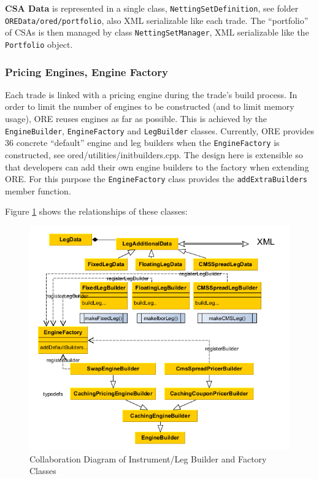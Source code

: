 \documentclass[12pt, a4paper]{report}
\begin{document}
{\bf CSA Data} is represented in a single class, {\tt NettingSetDefinition}, see folder {\tt OREData/ored/portfolio}, also XML serializable like each trade. The ``portfolio'' of CSAs is then managed by class {\tt NettingSetManager}, 
XML serializable like the {\tt Portfolio} object.

\subsubsection{Pricing Engines, Engine Factory}
Each trade is linked with a pricing engine during the trade's build process. In order to limit the number of engines to be constructed (and to limit memory usage), ORE reuses engines as far as possible. This is achieved by the {\tt EngineBuilder},
{\tt EngineFactory} and {\tt LegBuilder} classes. Currently, ORE provides 36 concrete ``default'' engine and leg builders when the {\tt EngineFactory} is constructed, see ored/utilities/initbuilders.cpp. The design here is extensible so that developers can add their own engine builders to the
factory when extending ORE. For this purpose the {\tt EngineFactory} class provides the {\tt addExtraBuilders} member function.

Figure \ref{fig_OREDPortfolio} shows the relationships of these classes:

\begin{figure}[h]
\begin{center}
\includegraphics[scale=0.6]{data/ORED_Portfolio}
\end{center}
\caption{Collaboration Diagram of Instrument/Leg Builder and Factory Classes}
\label{fig_OREDPortfolio}
\end{figure}
\end{document}
